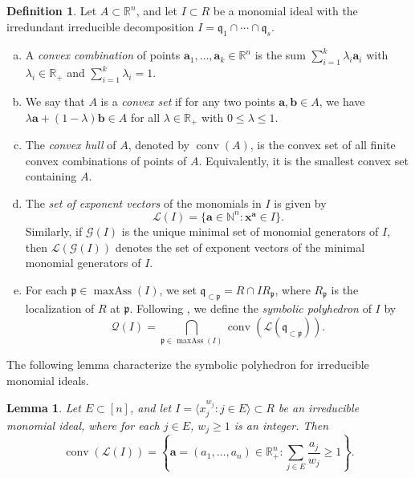 \documentclass[12pt,reqno]{amsart}
\newtheorem{lemma}[thm]{Lemma}
\theoremstyle{definition}
\newtheorem{defn}[thm]{Definition}
\DeclareMathOperator{\maxAss}{maxAss}
\DeclareMathOperator{\conv}{conv}
\newcommand{\p}{\mathfrak{p}}
\newcommand{\q}{\mathfrak{q}}
\newcommand{\RR}{\mathbb{R}}
\newcommand{\x}{\mathbf{x}}
\newcommand{\ba}{\mathbf{a}}
\newcommand{\bb}{\mathbf{b}}
\newcommand{\lattice}[1]{\mathcal L(#1)}
\newcommand{\symbpoly}{\mathcal{Q}}
\numberwithin{equation}{section}
\begin{document}
\begin{defn}
    Let $A \subset \RR^n$, and let $I\subset R$ be a monomial ideal with the irredundant irreducible decomposition $I = \q_1 \cap \cdots \cap \q_s.$
    \begin{enumerate}[(a)]
        \item A \textit{convex combination} of points $\ba_1, \ldots, \ba_k \in \RR^n$ is the sum $\sum_{i = 1}^{k} \lambda_i \ba_i$ with $\lambda_i \in \RR_{+}$ and $\sum_{i = 1}^{k} \lambda_i = 1.$
        
        \item We say that $A$ is a \textit{convex set} if for any two points $\ba, \bb \in A$, we have $\lambda \ba + (1 - \lambda) \bb \in A$ for all $\lambda \in \RR_{+}$ with $0 \le \lambda \le 1.$

        \item The \textit{convex hull} of $A$, denoted by $\conv(A)$, is the convex set of all finite convex combinations of points of $A.$ Equivalently, it is the smallest convex set containing $A.$
    
        \item The \textit{set of exponent vectors} of the monomials in $I$ is given by
        \[\lattice{I} = \{\ba \in \mathbb{N}^n : \x^{\ba} \in I\}.\]
        Similarly, if $\mathcal{G}(I)$ is the unique minimal set of monomial generators of $I$, then $\lattice{\mathcal{G}(I)}$ denotes the set of exponent vectors of the minimal monomial generators of $I.$

        \item For each $\p \in \maxAss(I)$, we set $\q_{\subset \p} = R \cap IR_{\p}$, where $R_{\p}$ is the localization of $R$ at $\p.$ Following \cite[Definition~5.3]{CEHH}, we define the \textit{symbolic polyhedron} of $I$ by
        \[\symbpoly(I) = \bigcap_{\p \in \maxAss(I)} \conv \left( \lattice{\q_{\subset \p}} \right).\]

       
     \end{enumerate}
\end{defn}

The following lemma characterize the symbolic polyhedron for irreducible monomial ideals.

\begin{lemma}\label{L-SymbolicPolyhedron}
    Let $E \subset [n]$, and let $I = \langle x_{j}^{w_j} : j \in E \rangle \subset R$ be an irreducible monomial ideal, where for each $j \in E$, $w_j \ge 1$ is an integer. Then 
    \[\conv(\lattice{I}) = \left\{ \ba = (a_1, \ldots, a_n) \in \RR_{+}^{n} : \sum_{j \in E} \dfrac{a_j}{w_j} \ge 1 \right\}.\]
\end{lemma} 
\end{document}
